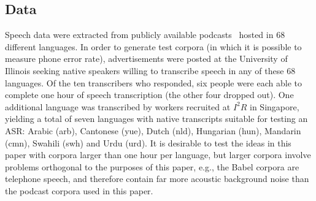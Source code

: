 \subsection{Data}
\label{sec:data}

Speech data were extracted from publicly available podcasts~\cite{SBS}
hosted in 68 different languages.  In order to generate test corpora
(in which it is possible to measure phone error rate), advertisements
were posted at the University of Illinois seeking native speakers
willing to transcribe speech in any of these 68 languages.  Of the ten
transcribers who responded, six people were each able to complete one
hour of speech transcription (the other four dropped out).  One
additional language was transcribed by workers recruited at $I^2R$ in
Singapore, yielding a total of seven languages with native
transcripts suitable for testing an ASR: Arabic (arb), Cantonese
(yue), Dutch (nld), Hungarian (hun), Mandarin (cmn), Swahili (swh) and
Urdu (urd).
It is desirable to test the ideas in this paper with corpora larger
than one hour per language, but larger corpora involve problems
orthogonal to the purposes of this paper, e.g., the Babel corpora
are telephone speech, and therefore contain far more acoustic
background noise than the podcast corpora used in this paper.

